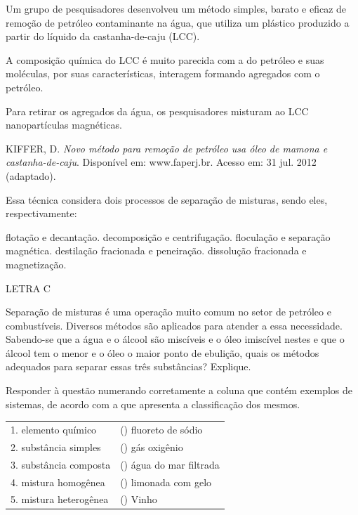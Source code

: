 \documentclass[9 pt]{scrartcl}
\def\PQ{0.84} %
\begin{document}
\begin{exercise}[points=\PQ]
Um grupo de pesquisadores desenvolveu um método simples, barato e eficaz de remoção de petróleo contaminante na água, que utiliza um plástico produzido a partir do líquido da castanha-de-caju (LCC).

A composição química do LCC é muito parecida com a do petróleo e suas moléculas, por suas características, interagem formando agregados com o petróleo.

Para retirar os agregados da água, os pesquisadores misturam ao LCC nanopartículas magnéticas.

KIFFER, D. \emph{Novo método para remoção de petróleo usa óleo de mamona e castanha-de-caju}.
Disponível em: www.faperj.br. Acesso em: 31 jul. 2012 (adaptado).

Essa técnica considera dois processos de separação de misturas, sendo eles, respectivamente:
\begin{choice}
\choice flotação e decantação.
\choice decomposição e centrifugação.
\choice floculação e separação magnética.
\choice destilação fracionada e peneiração.
\choice dissolução fracionada e magnetização.
\end{choice}
\end{exercise}
\begin{solution}
LETRA C
\end{solution}




\begin{exercise}[points=1.0]
Separação de misturas é uma operação muito comum no setor de petróleo e combustíveis. Diversos métodos são aplicados para atender a essa necessidade. Sabendo-se que a água e o álcool são miscíveis e o óleo imiscível nestes e que o álcool tem o menor e o óleo o maior ponto de ebulição, quais os métodos adequados para separar essas três substâncias? Explique.

\blank[width=9.\linewidth,linespread=1.5]{}
\end{exercise}




\begin{exercise}[points=1.0]
Responder à questão numerando corretamente a coluna que contém exemplos de sistemas, de acordo com a que apresenta a classificação dos mesmos.

\begin{center}
\begin{tabular}{ll}
1.  elemento    químico & (\quad) fluoreto de sódio\\
2.  substância  simples & (\quad ) gás oxigênio\\
3.  substância  composta & (\quad ) água do mar filtrada\\
4.  mistura     homogênea & (\quad ) limonada com gelo\\
5.  mistura     heterogênea & (\quad ) Vinho\\
\end{tabular}
\end{center}
\end{exercise}
\end{document}
